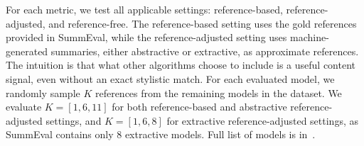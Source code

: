 For each metric, we test all applicable settings: reference-based, reference-adjusted, and reference-free. The reference-based setting uses the gold references provided in SummEval, while the reference-adjusted setting uses machine-generated summaries, either abstractive or extractive, as approximate references. The intuition is that what other algorithms choose to include is a useful content signal, even without an exact stylistic match. For each evaluated model, we randomly sample $K$ references from the remaining models in the dataset. We evaluate $K = [1, 6, 11]$ for both reference-based and abstractive reference-adjusted settings, and $K = [1, 6, 8]$ for extractive reference-adjusted settings, as SummEval contains only 8 extractive models. Full list of models is in~.